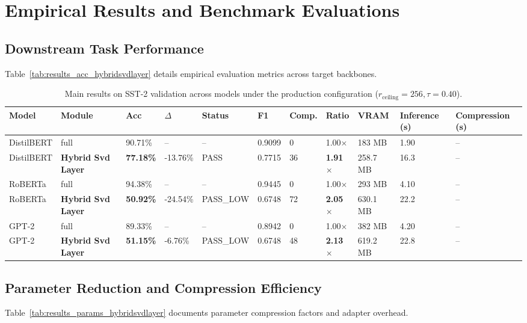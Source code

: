 \section{Empirical Results and Benchmark Evaluations}

\subsection{Downstream Task Performance}
Table~\ref{tab:results_acc_hybridsvdlayer} details empirical evaluation metrics across target backbones.

\begin{table}[t]
\centering
\small
\begin{tabular}{lllllllllll}
\toprule
\textbf{Model} & \textbf{Module} & \textbf{Acc} & \textbf{$\Delta$} & \textbf{Status} & \textbf{F1} & \textbf{Comp.} & \textbf{Ratio} & \textbf{VRAM} & \textbf{Inference (s)} & \textbf{Compression (s)} \\
\midrule
DistilBERT & full & 90.71\% & -- & -- & 0.9099 & 0 & 1.00$\times$ & 183 MB & 1.90 & -- \\
DistilBERT & \textbf{Hybrid Svd Layer} & \textbf{77.18\%} & -13.76\% & PASS & 0.7715 & 36 & \textbf{1.91$\times$} & 258.7 MB & 16.3 & -- \\
RoBERTa & full & 94.38\% & -- & -- & 0.9445 & 0 & 1.00$\times$ & 293 MB & 4.10 & -- \\
RoBERTa & \textbf{Hybrid Svd Layer} & \textbf{50.92\%} & -24.54\% & PASS\_LOW & 0.6748 & 72 & \textbf{2.05$\times$} & 630.1 MB & 22.2 & -- \\
GPT-2 & full & 89.33\% & -- & -- & 0.8942 & 0 & 1.00$\times$ & 382 MB & 4.20 & -- \\
GPT-2 & \textbf{Hybrid Svd Layer} & \textbf{51.15\%} & -6.76\% & PASS\_LOW & 0.6748 & 48 & \textbf{2.13$\times$} & 619.2 MB & 22.8 & -- \\
\bottomrule
\end{tabular}
\caption{Main results on SST-2 validation across models under the production configuration ($r_{\mathrm{ceiling}}=256, \tau=0.40$).}
\label{tab:main_sst2}
\end{table}

\subsection{Parameter Reduction and Compression Efficiency}
Table~\ref{tab:results_params_hybridsvdlayer} documents parameter compression factors and adapter overhead.

